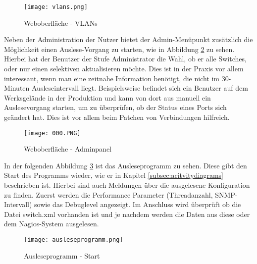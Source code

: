 \begin{figure}[H]
\centering
\texttt{[image: vlans.png]}
\caption[]{Weboberfläche - VLANs}
\label{fig:vlans}
\end{figure}

Neben der Administration der Nutzer bietet der Admin-Menüpunkt zusätzlich die Möglichkeit einen Auslese-Vorgang zu starten, wie in Abbildung \ref{fig:adminpanel} zu sehen.
Hierbei hat der Benutzer der Stufe Administrator die Wahl, ob er alle Switches, oder nur einen selektiven aktualisieren möchte.
Dies ist in der Praxis vor allem interessant, wenn man eine zeitnahe Information benötigt, die nicht im 30-Minuten Ausleseintervall liegt.
Beispielsweise befindet sich ein Benutzer auf dem Werksgelände in der Produktion und kann von dort aus manuell ein Auslesevorgang starten, um zu überprüfen, ob der Status eines Ports sich geändert hat.
Dies ist vor allem beim Patchen von Verbindungen hilfreich.

\begin{figure}[H]
\centering
\texttt{[image: 000.PNG]}
\caption[]{Weboberfläche - Adminpanel}
\label{fig:adminpanel}
\end{figure}

In der folgenden Abbildung \ref{fig:ausleseprogramm} ist das Ausleseprogramm zu sehen.
Diese gibt den Start des Programms wieder, wie er in Kapitel \ref{subsec:acitvitydiagrams} beschrieben ist.
Hierbei sind auch Meldungen über die ausgelesene Konfiguration zu finden.
Zuerst werden die Performance Parameter (Threadanzahl, SNMP-Intervall) sowie das Debuglevel angezeigt.
Im Anschluss wird überprüft ob die Datei switch.xml vorhanden ist und je nachdem werden die Daten aus diese oder dem Nagios-System ausgelesen.

\begin{figure}[H]
\centering
\texttt{[image: ausleseprogramm.png]}
\caption[]{Ausleseprogramm - Start}
\label{fig:ausleseprogramm}
\end{figure}








